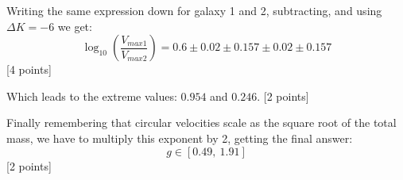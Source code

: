 \begin{description}
  Writing the same expression down for galaxy 1 and 2, subtracting, and
  using $\Delta K = -6$ we get:
  \[ \log_{10}\!\left(\frac{V_{max1}}{V_{max2}}\right)
     = 0.6\pm 0.02\pm 0.157\pm 0.02\pm 0.157 \]
  \hfill[4 points]

  Which leads to the extreme values: $0.954$ and $0.246$.
  \hfill[2 points]

  Finally remembering that circular velocities scale as the square root
  of the total mass, we have to multiply this exponent by 2, getting the
  final answer:
  \[ g\in[0.49,\ 1.91] \]
  \hfill[2 points]
\end{description}
